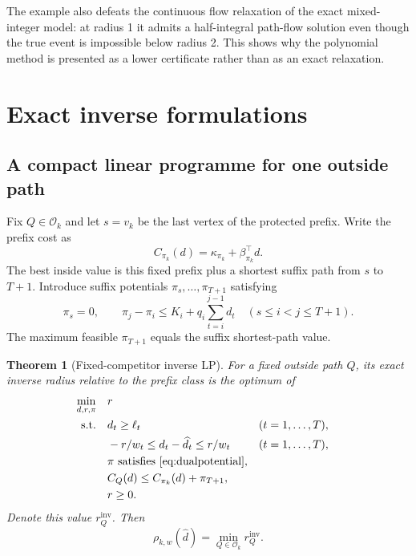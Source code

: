 \documentclass[11pt]{article}
\newtheorem{theorem}{Theorem}[section]
\theoremstyle{definition}
\newcommand{\cO}{\mathcal{O}}
\newcommand{\dhat}{\widehat d}
\newcommand{\ellv}{\ell}
\begin{document}
The example also defeats the continuous flow relaxation of the exact mixed-integer model: at radius 1 it admits a half-integral path-flow solution even though the true event is impossible below radius 2. This shows why the polynomial method is presented as a lower certificate rather than as an exact relaxation.

\section{Exact inverse formulations}

\subsection{A compact linear programme for one outside path}

Fix $Q\in\cO_k$ and let $s=v_k$ be the last vertex of the protected prefix. Write the prefix cost as
\[
C_{\pi_k}(d)=\kappa_{\pi_k}+\beta_{\pi_k}^\top d.
\]
The best inside value is this fixed prefix plus a shortest suffix path from $s$ to $T+1$. Introduce suffix potentials $\pi_s,\ldots,\pi_{T+1}$ satisfying
\begin{equation}\label{eq:dualpotential}
\pi_s=0,
\qquad
\pi_j-\pi_i\le K_i+q_i\sum_{t=i}^{j-1}d_t
\quad(s\le i<j\le T+1).
\end{equation}
The maximum feasible $\pi_{T+1}$ equals the suffix shortest-path value.

\begin{theorem}[Fixed-competitor inverse LP]\label{thm:fixedlp}
For a fixed outside path $Q$, its exact inverse radius relative to the prefix class is the optimum of
\begin{align}
\min_{d,r,\pi}\quad &r\label{eq:fixedlp}\\
\text{s.t.}\quad
&d_t\ge\ellv_t &&(t=1,\ldots,T),\notag\\
&-r/w_t\le d_t-\dhat_t\le r/w_t &&(t=1,\ldots,T),\notag\\
&\pi\text{ satisfies \eqref{eq:dualpotential}},\notag\\
&C_Q(d)\le C_{\pi_k}(d)+\pi_{T+1},\notag\\
&r\ge0.\notag
\end{align}
Denote this value $r_Q^{\mathrm{inv}}$. Then
\begin{equation}\label{eq:exactdisjunction}
\rho_{k,w}(\dhat)=\min_{Q\in\cO_k}r_Q^{\mathrm{inv}}.
\end{equation}
\end{theorem}
\end{document}
